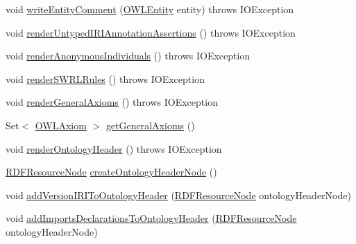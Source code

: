 \begin{DoxyCompactItemize}
\item 
void \hyperlink{classorg_1_1coode_1_1owlapi_1_1rdf_1_1renderer_1_1_r_d_f_renderer_base_a7a17188d40afdc8de3a659685e46136c}{write\-Entity\-Comment} (\hyperlink{interfaceorg_1_1semanticweb_1_1owlapi_1_1model_1_1_o_w_l_entity}{O\-W\-L\-Entity} entity)  throws I\-O\-Exception 
\item 
void \hyperlink{classorg_1_1coode_1_1owlapi_1_1rdf_1_1renderer_1_1_r_d_f_renderer_base_ac806a8d48d958d467d7c05f20ba1b189}{render\-Untyped\-I\-R\-I\-Annotation\-Assertions} ()  throws I\-O\-Exception 
\item 
void \hyperlink{classorg_1_1coode_1_1owlapi_1_1rdf_1_1renderer_1_1_r_d_f_renderer_base_af1ae89e5e3df5e5d84aabb15e909dddb}{render\-Anonymous\-Individuals} ()  throws I\-O\-Exception 
\item 
void \hyperlink{classorg_1_1coode_1_1owlapi_1_1rdf_1_1renderer_1_1_r_d_f_renderer_base_acf3182313fc0954e0dbf5490099c0f6d}{render\-S\-W\-R\-L\-Rules} ()  throws I\-O\-Exception 
\item 
void \hyperlink{classorg_1_1coode_1_1owlapi_1_1rdf_1_1renderer_1_1_r_d_f_renderer_base_a05dc5d7f2bbf422d64edf1927fadf1cb}{render\-General\-Axioms} ()  throws I\-O\-Exception 
\item 
Set$<$ \hyperlink{interfaceorg_1_1semanticweb_1_1owlapi_1_1model_1_1_o_w_l_axiom}{O\-W\-L\-Axiom} $>$ \hyperlink{classorg_1_1coode_1_1owlapi_1_1rdf_1_1renderer_1_1_r_d_f_renderer_base_a74059b4eaebbbb50cafbdcfa5a13f650}{get\-General\-Axioms} ()
\item 
void \hyperlink{classorg_1_1coode_1_1owlapi_1_1rdf_1_1renderer_1_1_r_d_f_renderer_base_aacdab83d17d3ad43578921d55609a7d1}{render\-Ontology\-Header} ()  throws I\-O\-Exception 
\item 
\hyperlink{classorg_1_1coode_1_1owlapi_1_1rdf_1_1model_1_1_r_d_f_resource_node}{R\-D\-F\-Resource\-Node} \hyperlink{classorg_1_1coode_1_1owlapi_1_1rdf_1_1renderer_1_1_r_d_f_renderer_base_a6a58e62164e5ab86a4b41765f83193c1}{create\-Ontology\-Header\-Node} ()
\item 
void \hyperlink{classorg_1_1coode_1_1owlapi_1_1rdf_1_1renderer_1_1_r_d_f_renderer_base_aa8234839e608f57e8b8f60b0c2a43ba2}{add\-Version\-I\-R\-I\-To\-Ontology\-Header} (\hyperlink{classorg_1_1coode_1_1owlapi_1_1rdf_1_1model_1_1_r_d_f_resource_node}{R\-D\-F\-Resource\-Node} ontology\-Header\-Node)
\item 
void \hyperlink{classorg_1_1coode_1_1owlapi_1_1rdf_1_1renderer_1_1_r_d_f_renderer_base_a72bb9855d484d7a4108fda355a77eed8}{add\-Imports\-Declarations\-To\-Ontology\-Header} (\hyperlink{classorg_1_1coode_1_1owlapi_1_1rdf_1_1model_1_1_r_d_f_resource_node}{R\-D\-F\-Resource\-Node} ontology\-Header\-Node)

\end{DoxyCompactItemize}
